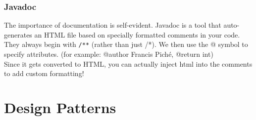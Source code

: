 \documentclass[12pt]{article}
\theoremstyle{definition}
\begin{document}
\section{Javadoc}
The importance of documentation is self-evident. Javadoc is a tool that auto-generates an HTML file based on specially formatted comments in your code. They always begin with \texttt{/**} (rather than just /*). We then use the @ symbol to specify attributes. (for example: @author Francis Pich\'e, @return int) 
\\ \linebreak
Since it gets converted to HTML, you can actually inject html into the comments to add custom formatting!
\part{Design Patterns}
\end{document}
